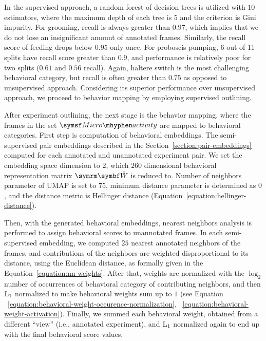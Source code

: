 In the supervised approach, a random forest of decision trees \citep{breiman_random_2001} is utilized with $10$ estimators, where the maximum depth of each tree is $5$ and the criterion is Gini impurity.
For grooming, recall is always greater than $0.97$, which implies that we do not lose an insignificant amount of annotated frames.
Similarly, the recall score of feeding drops below $0.95$ only once.
For proboscis pumping, 6 out of 11 splits have recall score greater than $0.9$, and performance is relatively poor for two splits ($0.61$ and $0.56$ recall).
Again, haltere switch is the most challenging behavioral category, but recall is often greater than $0.75$ as opposed to unsupervised approach.
Considering its superior performance over unsupervised approach, we proceed to behavior mapping by employing supervised outlining.

After experiment outlining, the next stage is the behavior mapping, where the frames in the set $\MicroActivity$ are mapped to behavioral categories.
First step is computation of behavioral embeddings.
The semi-supervised pair embeddings described in the Section~\ref{section:pair-embeddings} computed for each annotated and unannotated experiment pair.
We set the embedding space dimension to 2, which $260$ dimensional behavioral representation matrix $\V{\hat{W}}$ is reduced to.
Number of neighbors parameter of UMAP is set to $75$, minimum distance parameter is determined as $0$, and the distance metric is Hellinger distance (Equation~\ref{equation:hellinger-distance}).

Then, with the generated behavioral embeddings, nearest neighbors analysis is performed to assign behavioral scores to unannotated frames.
In each semi-supervised embedding, we computed $25$ nearest annotated neighbors of the frames, and contributions of the neighbors are weighted disproportional to its distance, using the Euclidean distance, as formally given in the Equation~\ref{equation:nn-weights}.
After that, weights are normalized with the $\log_2$ number of occurrences of behavioral category of contributing neighbors, and then $\textnormal{L}_1$ normalized to make behavioral weights sum up to $1$ (see Equation ~\ref{equation:behavioral-weight-occurence-normalization}, ~\ref{equation:behavioral-weight-activation}). Finally, we summed each behavioral weight, obtained from a different ``view'' (i.e., annotated experiment), and $\textnormal{L}_1$ normalized again to end up with the final behavioral score values.

